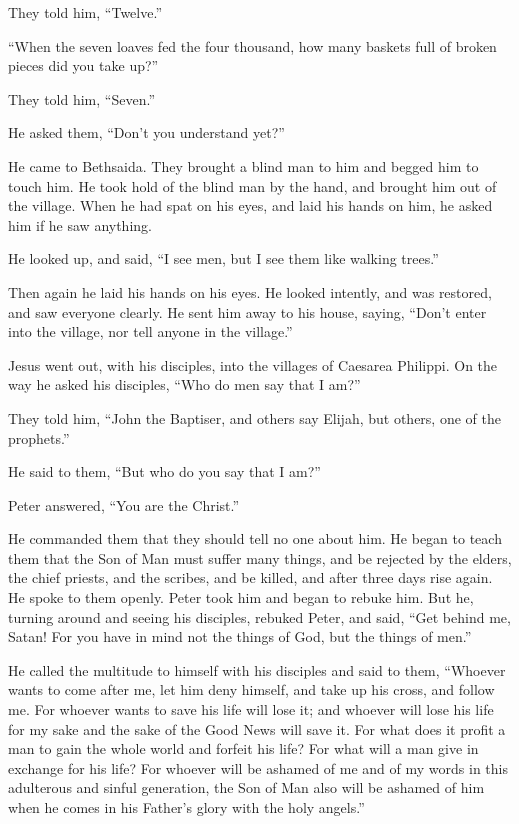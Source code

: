 They told him, ``Twelve.''

 ``When the seven loaves fed the four thousand, how many
baskets full of broken pieces did you take up?''

They told him, ``Seven.''

 He asked them, ``Don't you understand yet?''

 He came to Bethsaida. They brought a blind man to him and
begged him to touch him.  He took hold of the blind man by
the hand, and brought him out of the village. When he had spat on his
eyes, and laid his hands on him, he asked him if he saw anything.

 He looked up, and said, ``I see men, but I see them like
walking trees.''

 Then again he laid his hands on his eyes. He looked
intently, and was restored, and saw everyone clearly.  He
sent him away to his house, saying, ``Don't enter into the village, nor
tell anyone in the village.''

 Jesus went out, with his disciples, into the villages of
Caesarea Philippi. On the way he asked his disciples, ``Who do men say
that I am?''

 They told him, ``John the Baptiser, and others say Elijah,
but others, one of the prophets.''

 He said to them, ``But who do you say that I am?''

Peter answered, ``You are the Christ.''

 He commanded them that they should tell no one about him.
 He began to teach them that the Son of Man must suffer
many things, and be rejected by the elders, the chief priests, and the
scribes, and be killed, and after three days rise again. 
He spoke to them openly. Peter took him and began to rebuke him.
 But he, turning around and seeing his disciples, rebuked
Peter, and said, ``Get behind me, Satan! For you have in mind not the
things of God, but the things of men.''

 He called the multitude to himself with his disciples and
said to them, ``Whoever wants to come after me, let him deny himself,
and take up his cross, and follow me.  For whoever wants to
save his life will lose it; and whoever will lose his life for my sake
and the sake of the Good News will save it.  For what does
it profit a man to gain the whole world and forfeit his life?
 For what will a man give in exchange for his life?
 For whoever will be ashamed of me and of my words in this
adulterous and sinful generation, the Son of Man also will be ashamed of
him when he comes in his Father's glory with the holy angels.''

